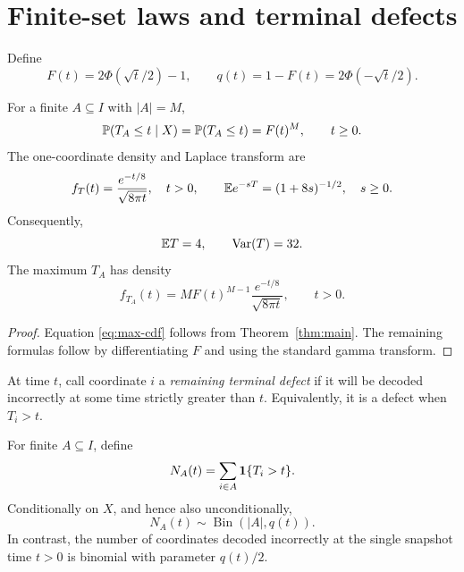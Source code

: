 \section{Finite-set laws and terminal defects}

Define
\begin{equation}\label{eq:F-and-q}
  F(t)=2\Phi(\sqrt t/2)-1,
  \qquad
  q(t)=1-F(t)=2\Phi(-\sqrt t/2).
\end{equation}

\begin{corollary}\label{cor:finite-set}
For a finite $A\subseteq I$ with $|A|=M$,
\begin{equation}\label{eq:max-cdf}
  \P(T_A\le t\mid X)=\P(T_A\le t)=F(t)^M,
  \qquad t\ge0.
\end{equation}
The one-coordinate density and Laplace transform are
\begin{equation}\label{eq:scalar-density-laplace}
  f_T(t)=\frac{e^{-t/8}}{\sqrt{8\pi t}},\quad t>0,
  \qquad
  \E e^{-sT}=(1+8s)^{-1/2},\quad s\ge0.
\end{equation}
Consequently,
\begin{equation}\label{eq:scalar-moments}
  \E T=4,
  \qquad
  \Var(T)=32.
\end{equation}
The maximum $T_A$ has density
\begin{equation}\label{eq:max-density}
  f_{T_A}(t)=M F(t)^{M-1}\frac{e^{-t/8}}{\sqrt{8\pi t}},
  \qquad t>0.
\end{equation}
\end{corollary}

\begin{proof}
Equation \eqref{eq:max-cdf} follows from Theorem~\ref{thm:main}.  The remaining
formulas follow by differentiating $F$ and using the standard gamma transform.
\end{proof}

At time $t$, call coordinate $i$ a \emph{remaining terminal defect} if it will
be decoded incorrectly at some time strictly greater than $t$.  Equivalently,
it is a defect when $T_i>t$.

\begin{corollary}\label{cor:defect-count}
For finite $A\subseteq I$, define
\begin{equation}\label{eq:defect-count}
  N_A(t)=\sum_{i\in A}\1\{T_i>t\}.
\end{equation}
Conditionally on $X$, and hence also unconditionally,
\begin{equation}\label{eq:binomial-defects}
  N_A(t)\sim\operatorname{Bin}(|A|,q(t)).
\end{equation}
In contrast, the number of coordinates decoded incorrectly at the single
snapshot time $t>0$ is binomial with parameter $q(t)/2$.
\end{corollary}

